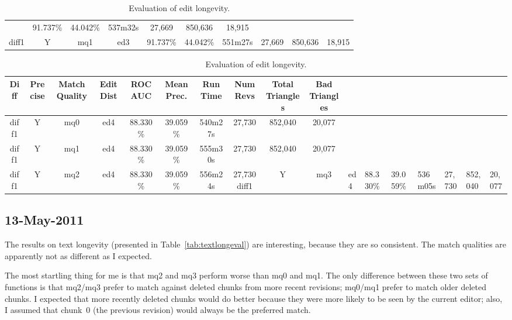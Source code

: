 \begin{sidewaystable}[!tp]
\begin{center}
\begin{tabular}{|c|c|c|c||c|c||c|c|c|c|}
	& 91.737\% & 44.042\%
	& 537m32s & 27,669
	& 850,636 & 18,915 \\
diff1 & Y & mq1 & ed3
	& 91.737\% & 44.042\%
	& 551m27s & 27,669
	& 850,636 & 18,915 \\
\hline
    \end{tabular}
  \end{center}
  \caption{Evaluation of edit longevity.}
\end{sidewaystable}


\begin{sidewaystable}[!tp]
  \begin{center}
    \begin{tabular}{|c|c|c|c||c|c||c|c|c|c|}
\hline
Diff & Precise & Match Quality & Edit Dist
	& ROC AUC & Mean Prec.
	& Run Time & Num Revs
	& Total Triangles & Bad Triangles \\
\hline
\hline
diff1 & Y & mq0 & ed4
	& 88.330\% & 39.059\%
	& 540m27s & 27,730
	& 852,040 & 20,077 \\
diff1 & Y & mq1 & ed4
	& 88.330\% & 39.059\%
	& 555m30s & 27,730
	& 852,040 & 20,077 \\
diff1 & Y & mq2 & ed4
	& 88.330\% & 39.059\%
	& 556m24s & 27,730
diff1 & Y & mq3 & ed4
	& 88.330\% & 39.059\%
	& 536m05s & 27,730
	& 852,040 & 20,077 \\
\hline
    \end{tabular}
  \end{center}
  \caption{Evaluation of edit longevity.}
\end{sidewaystable}

\subsection{13-May-2011}

The results on text longevity
(presented in Table~\ref{tab:textlongeval})
are interesting, because they are so consistent.
The match qualities are apparently not as different
as I expected.

The most startling thing for me is that mq2 and mq3
perform worse than mq0 and mq1.
The only difference between these two sets of functions
is that mq2/mq3 prefer to match against deleted chunks from
more recent revisions; mq0/mq1 prefer to match older deleted chunks.
I expected that more recently deleted chunks would do better
because they were more likely to be seen by the current editor;
also, I assumed that chunk~0 (the previous revision) would always
be the preferred match.

